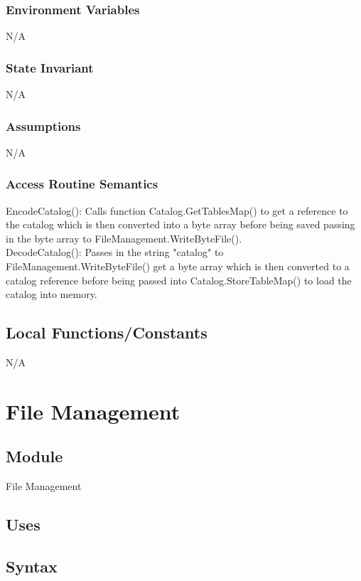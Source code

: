 \documentclass[12pt]{article}
\begin{document}
\subsubsection{Environment Variables}
N/A
\subsubsection{State Invariant}
N/A
\subsubsection{Assumptions}
N/A

\subsubsection{Access Routine Semantics}
\noindent EncodeCatalog(): Calls function Catalog.GetTablesMap() to get a reference to the catalog which is then converted into a byte array before being saved passing in the byte array to FileManagement.WriteByteFile().\\

\noindent DecodeCatalog(): Passes in the string "catalog" to FileManagement.WriteByteFile() get a byte array which is then converted to a catalog reference before being passed into Catalog.StoreTableMap() to load the catalog into memory.\\

\subsection{Local Functions/Constants}
N/A

\newpage

\section{File Management}

\subsection{Module}
File Management

\subsection{Uses}

\subsection{Syntax}
\end{document}
